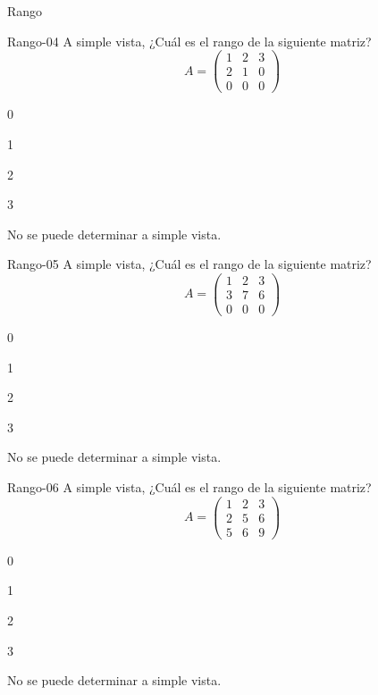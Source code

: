 \documentclass[a4,11pt]{aleph-notas}
\begin{document}
\begin{quiz}{Rango}
\begin{multi}[]%
    {Rango-04}
    A simple vista, ¿Cuál es el rango de la siguiente matriz?
    \[
        A=\begin{pmatrix} 1 & 2 & 3 \\ 2 & 1 & 0 \\ 0 & 0 & 0 \end{pmatrix}
    \]
    \item 0
    \item 1
    \item 2
    \item 3
    \item* No se puede determinar a simple vista.
\end{multi}

\begin{multi}[]%
    {Rango-05}
    A simple vista, ¿Cuál es el rango de la siguiente matriz?
    \[
        A=\begin{pmatrix} 1 & 2 & 3 \\ 3 & 7 & 6 \\ 0 & 0 & 0 \end{pmatrix}
    \]
    \item 0
    \item 1
    \item 2
    \item 3
    \item* No se puede determinar a simple vista.
\end{multi}

\begin{multi}[]%
    {Rango-06}
    A simple vista, ¿Cuál es el rango de la siguiente matriz?
    \[
        A=\begin{pmatrix} 1 & 2 & 3 \\ 2 & 5 & 6 \\ 5 & 6 & 9 \end{pmatrix}
    \]
    \item 0
    \item 1
    \item 2
    \item 3
    \item* No se puede determinar a simple vista.
\end{multi}


\end{quiz}
\end{document}
